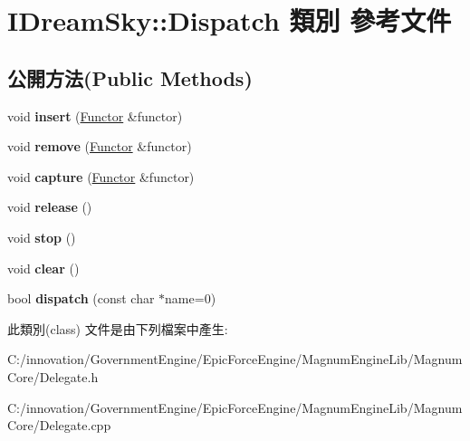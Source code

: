 \hypertarget{class_i_dream_sky_1_1_dispatch}{}\section{I\+Dream\+Sky\+:\+:Dispatch 類別 參考文件}
\label{class_i_dream_sky_1_1_dispatch}
\subsection*{公開方法(Public Methods)}
\begin{DoxyCompactItemize}
\item 
void {\bfseries insert} (\hyperlink{class_i_dream_sky_1_1_functor}{Functor} \&functor)\hypertarget{class_i_dream_sky_1_1_dispatch_ab3fae5ebf4c1f6068befddc3687fa1a8}{}\label{class_i_dream_sky_1_1_dispatch_ab3fae5ebf4c1f6068befddc3687fa1a8}

\item 
void {\bfseries remove} (\hyperlink{class_i_dream_sky_1_1_functor}{Functor} \&functor)\hypertarget{class_i_dream_sky_1_1_dispatch_a6d3c2269ab7fe872d8a92a51eaee7f54}{}\label{class_i_dream_sky_1_1_dispatch_a6d3c2269ab7fe872d8a92a51eaee7f54}

\item 
void {\bfseries capture} (\hyperlink{class_i_dream_sky_1_1_functor}{Functor} \&functor)\hypertarget{class_i_dream_sky_1_1_dispatch_a682011e28a7698da903ae136ba74d617}{}\label{class_i_dream_sky_1_1_dispatch_a682011e28a7698da903ae136ba74d617}

\item 
void {\bfseries release} ()\hypertarget{class_i_dream_sky_1_1_dispatch_a1579ea55b98f8a0eb213d97c579b1b6b}{}\label{class_i_dream_sky_1_1_dispatch_a1579ea55b98f8a0eb213d97c579b1b6b}

\item 
void {\bfseries stop} ()\hypertarget{class_i_dream_sky_1_1_dispatch_a464c2f6db116c45e150fd99b43987372}{}\label{class_i_dream_sky_1_1_dispatch_a464c2f6db116c45e150fd99b43987372}

\item 
void {\bfseries clear} ()\hypertarget{class_i_dream_sky_1_1_dispatch_a0b3d07604cfe17b84de206a8a373595d}{}\label{class_i_dream_sky_1_1_dispatch_a0b3d07604cfe17b84de206a8a373595d}

\item 
bool {\bfseries dispatch} (const char $\ast$name=0)\hypertarget{class_i_dream_sky_1_1_dispatch_a71d8a311ef1c107842cc58483c449b3f}{}\label{class_i_dream_sky_1_1_dispatch_a71d8a311ef1c107842cc58483c449b3f}

\end{DoxyCompactItemize}


此類別(class) 文件是由下列檔案中產生\+:\begin{DoxyCompactItemize}
\item 
C\+:/innovation/\+Government\+Engine/\+Epic\+Force\+Engine/\+Magnum\+Engine\+Lib/\+Magnum\+Core/Delegate.\+h\item 
C\+:/innovation/\+Government\+Engine/\+Epic\+Force\+Engine/\+Magnum\+Engine\+Lib/\+Magnum\+Core/Delegate.\+cpp\end{DoxyCompactItemize}
